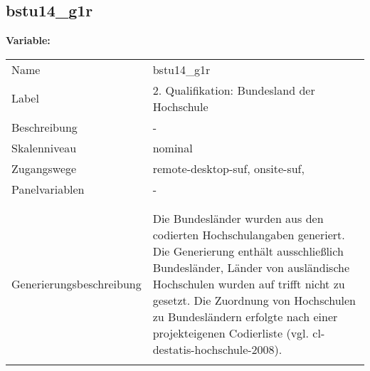 	
	
	\subsection{bstu14\_g1r}
	\label{subSection:bstu14_g1r}

	\noindent\textbf{Variable:}\\
		\begin{tabular}{lL{11.3cm}}
			\label{tableVariable:bstu14_g1r}
			Name & bstu14\_g1r \\
			Label & 2. Qualifikation: Bundesland der Hochschule \\
			Beschreibung & - \\
			Skalenniveau & nominal \\
			Zugangswege &
				remote-desktop-suf,
				onsite-suf,
 \\
			Panelvariablen & -
			 \\
			 \\
 \\
					Generierungsbeschreibung & Die Bundesländer wurden aus den codierten Hochschulangaben generiert. Die Generierung enthält ausschließlich Bundesländer, Länder von ausländische Hochschulen wurden auf trifft nicht zu gesetzt. Die Zuordnung von Hochschulen zu Bundesländern erfolgte nach einer projekteigenen Codierliste (vgl. cl-destatis-hochschule-2008).
				 \\	
			 \\
		\end{tabular}






